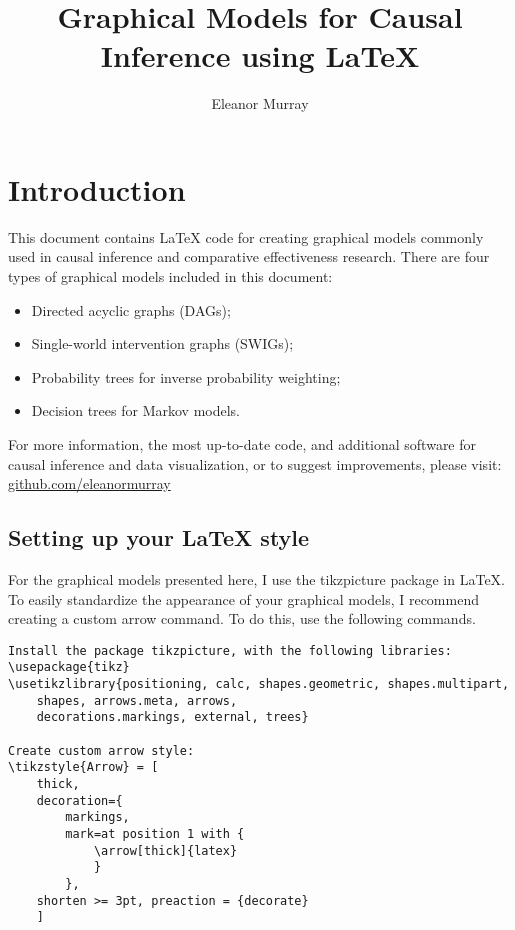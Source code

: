 \documentclass[a4paper]{report}
\title{Graphical Models for Causal Inference using LaTeX}
\author{Eleanor Murray}
\begin{document}
\maketitle

\tableofcontents

\chapter{Introduction}
This document contains LaTeX code for creating graphical models commonly used in causal inference and comparative effectiveness research. There are four types of graphical models included in this document: 
\begin{itemize}
\item Directed acyclic graphs (DAGs); 
\item Single-world intervention graphs (SWIGs); 
\item Probability trees for inverse probability weighting;
\item Decision trees for Markov models. 
\end{itemize}

For more information, the most up-to-date code, and additional software for causal inference and data visualization, or to suggest improvements, please visit: \url{github.com/eleanormurray}


\vspace{3mm}

\section{Setting up your LaTeX style}

For the graphical models presented here, I use the tikzpicture package in LaTeX. To easily standardize the appearance of your graphical models, I recommend creating a custom arrow command. To do this, use the following commands.

\vspace{3mm}
\begin{Verbatim}[frame=single]
Install the package tikzpicture, with the following libraries:
\usepackage{tikz}
\usetikzlibrary{positioning, calc, shapes.geometric, shapes.multipart, 
	shapes, arrows.meta, arrows, 
	decorations.markings, external, trees}

Create custom arrow style:
\tikzstyle{Arrow} = [
	thick, 
	decoration={
		markings,
		mark=at position 1 with {
			\arrow[thick]{latex}
			}
		}, 
	shorten >= 3pt, preaction = {decorate}
	]

\end{Verbatim}
\end{document}
